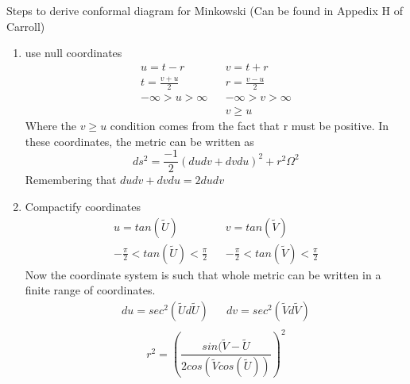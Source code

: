 \documentclass[10pt]{article}
\begin{document}
    \newline	Steps to derive conformal diagram for Minkowski
               	(Can be found in Appedix H of Carroll)
               	\begin{enumerate}
                    \item use null coordinates 
                    \begin{equation}
                   \begin{align}
                        u=t-r && v=t+r\\
                        t=\frac{v+u}{2} &&r=\frac{v-u}{2} \\
                        -\infty>u>\infty && -\infty>v>\infty\\
                        && v\geq{u}
                        \end{align}
                    \end{equation}
                    Where the \(v\geq{u}\) condition comes from the fact that r must be positive. 
                    In these coordinates, the metric can be written as 
                    \begin{equation}
                        ds^2=\frac{-1}{2}(dudv+dvdu)^2+r^2\Omega^2
                    \end{equation}
                    Remembering that \(dudv+dvdu=2dudv\)
                    \item Compactify coordinates
                    \begin{equation}
                   \begin{align}
                        u=tan(\widetilde{U}) && v=tan(\widetilde{V})\\
                        -\frac{\pi}{2}<tan(\widetilde{U})<\frac{\pi}{2} && -\frac{\pi}{2}<tan(\widetilde{V})<\frac{\pi}{2}
                        \end{align}
                    \end{equation}
            Now the coordinate system is such that whole metric can be written in a finite range of coordinates.
                                \begin{equation}
                   \begin{align}
                        du=sec^2(\widetilde{U}d\widetilde{U})&&dv=sec^2(\widetilde{V}d\widetilde{V})\\
                        \end{align}
                    \end{equation}
                    \begin{equation}
                        r^2=(\frac{sin(\widetilde{V}-\widetilde{U}}{2cos(\widetilde{V}cos(\widetilde{U}))})^2
                    \end{equation}
            

\end{enumerate}
\end{document}
